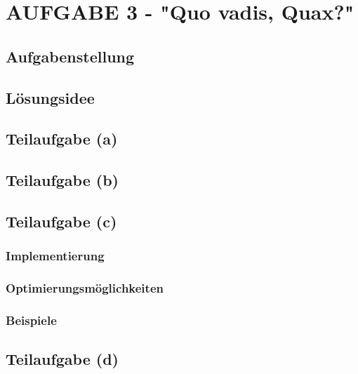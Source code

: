 \documentclass[a4paper,12pt]{article}
\begin{document}

\newpage
\section{AUFGABE 3 - "Quo vadis, Quax?"}



\subsection{Aufgabenstellung}

\subsection{Lösungsidee}

\subsection{Teilaufgabe (a)}

\subsection{Teilaufgabe (b)}

\subsection{Teilaufgabe (c)}
\subsubsection{Implementierung}
\subsubsection{Optimierungsmöglichkeiten}
\subsubsection{Beispiele}

\subsection{Teilaufgabe (d)}


\end{document}
